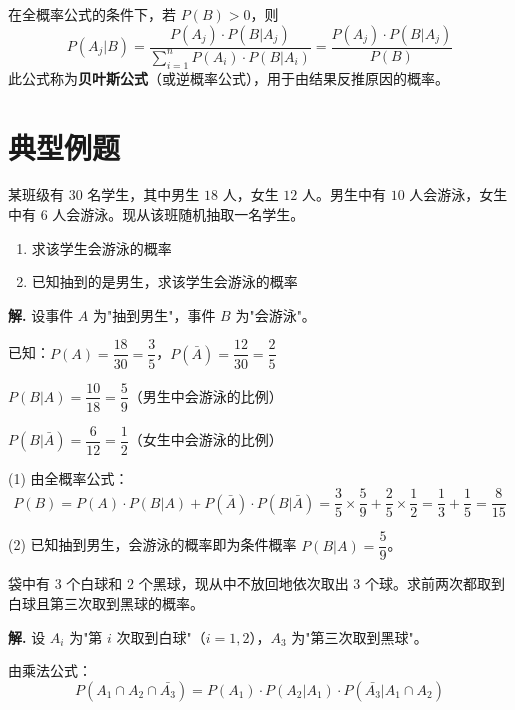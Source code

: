 \documentclass[11pt]{ctexrep}
\begin{document}
\begin{definition}[贝叶斯公式]
    在全概率公式的条件下，若 $P(B) > 0$，则
    \[
        P(A_j | B) = \frac{P(A_j) \cdot P(B | A_j)}{\sum_{i=1}^{n} P(A_i) \cdot P(B | A_i)} = \frac{P(A_j) \cdot P(B | A_j)}{P(B)}
    \]
    此公式称为\textbf{贝叶斯公式}（或逆概率公式），用于由结果反推原因的概率。
\end{definition}

\section*{典型例题}

\begin{example}[条件概率基础计算]
    某班级有 $30$ 名学生，其中男生 $18$ 人，女生 $12$ 人。男生中有 $10$ 人会游泳，女生中有 $6$ 人会游泳。现从该班随机抽取一名学生。
    \begin{enumerate}
        \item 求该学生会游泳的概率
        \item 已知抽到的是男生，求该学生会游泳的概率
    \end{enumerate}
\end{example}

\textbf{解.} 设事件 $A$ 为"抽到男生"，事件 $B$ 为"会游泳"。

已知：$P(A) = \dfrac{18}{30} = \dfrac{3}{5}$，$P(\bar{A}) = \dfrac{12}{30} = \dfrac{2}{5}$

$P(B | A) = \dfrac{10}{18} = \dfrac{5}{9}$（男生中会游泳的比例）

$P(B | \bar{A}) = \dfrac{6}{12} = \dfrac{1}{2}$（女生中会游泳的比例）

(1) 由全概率公式：
\[
    P(B) = P(A) \cdot P(B | A) + P(\bar{A}) \cdot P(B | \bar{A}) = \frac{3}{5} \times \frac{5}{9} + \frac{2}{5} \times \frac{1}{2} = \frac{1}{3} + \frac{1}{5} = \frac{8}{15}
\]

(2) 已知抽到男生，会游泳的概率即为条件概率 $P(B | A) = \dfrac{5}{9}$。

\begin{example}[乘法公式的应用]
    袋中有 $3$ 个白球和 $2$ 个黑球，现从中不放回地依次取出 $3$ 个球。求前两次都取到白球且第三次取到黑球的概率。
\end{example}

\textbf{解.} 设 $A_i$ 为"第 $i$ 次取到白球"（$i = 1, 2$），$A_3$ 为"第三次取到黑球"。

由乘法公式：
\[
    P(A_1 \cap A_2 \cap \bar{A_3}) = P(A_1) \cdot P(A_2 | A_1) \cdot P(\bar{A_3} | A_1 \cap A_2)
\]
\end{document}
